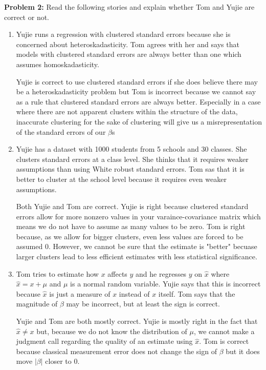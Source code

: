 \documentclass[11pt]{SelfArxOneColBMN}
\begin{document}
\textbf{Problem 2:} Read the following stories and explain whether Tom and Yujie are correct or not.
\begin{enumerate}
  \item Yujie runs a regression with clustered standard errors because she is concerned about heteroskadasticity. Tom agrees with her and says that models with clustered standard errors are always better than one which assumes homoskadasticity.

  \begin{solution}
    Yujie is correct to use clustered standard errors if she does believe there may be a heteroskadasticity problem but Tom is incorrect because we cannot say as a rule that clustered standard errors are always better. Especially in a case where there are not apparent clusters within the structure of the data, inaccurate clustering for the sake of clustering will give us a misrepresentation of the standard errors of our $\beta$s
  \end{solution}

  \item Yujie has a dataset with 1000 students from 5 schools and 30 classes. She clusters standard errors at a class level. She thinks that it requires weaker assumptions than using White robust standard errors. Tom sas that it is better to cluster at the school level because it requires even weaker assumptions.

  \begin{solution}
    Both Yujie and Tom are correct. Yujie is right because clustered standard errors allow for more nonzero values in your varaince-covariance matrix which means we do not have to assume as many values to be zero. Tom is right because, as we allow for bigger clusters, even less values are forced to be assumed 0. However, we cannot be sure that the estimate is "better" becuase larger clusters lead to less efficient estimates with less statistical significance. 
  \end{solution}

  \item Tom tries to estimate how $x$ affects $y$ and he regresses $y$ on $\hat{x}$ where $\hat{x} = x + \mu$ and $\mu$ is a normal random variable. Yujie says that this is incorrect because $\hat{x}$ is just a measure of $x$ instead of $x$ itself. Tom says that the magnitude of $\beta$ may be incorrect, but at least the sign is correct.
  \begin{solution}
    Yujie and Tom are both mostly correct. Yujie is mostly right in the fact that $\hat{x} \neq x$ but, because we do not know the distribution of $\mu$, we cannot make a judgment call regarding the quality of an estimate using $\hat{x}$. Tom is correct because classical measurement error does not change the sign of $\beta$ but it does move $|\beta|$ closer to 0.
  \end{solution}



\end{enumerate}
\end{document}
